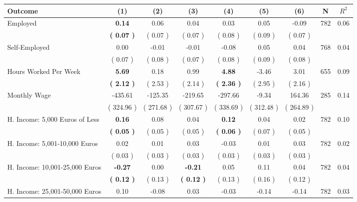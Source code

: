 \begin{tabular}{lcccccccc}
\toprule
 \textbf{Outcome} & \textbf{(1)} & \textbf{(2)} & \textbf{(3)} & \textbf{(4)} & \textbf{(5)} & \textbf{(6)} & \textbf{N} & \textbf{$ R^2$} \\
\midrule
Employed & \textbf{     0.14} &      0.06 &      0.04 &      0.03 &      0.05 &     -0.09 & 782 &       0.06 \\ 
 & \textbf{(     0.07 )} & (     0.07 ) & (     0.07 ) & (     0.08 ) & (     0.09 ) & (     0.07 ) & \\
Self-Employed &      0.00 &     -0.01 &     -0.01 &     -0.08 &      0.05 &      0.04 & 768 &       0.04 \\ 
 & (     0.07 ) & (     0.08 ) & (     0.07 ) & (     0.08 ) & (     0.09 ) & (     0.08 ) & \\
Hours Worked Per Week & \textbf{     5.69} &      0.18 &      0.99 & \textbf{     4.88} &     -3.46 &      3.01 & 655 &       0.09 \\ 
 & \textbf{(     2.12 )} & (     2.53 ) & (     2.14 ) & \textbf{(     2.36 )} & (     2.95 ) & (     2.16 ) & \\
Monthly Wage &   -435.61 &   -125.35 &   -219.65 &   -297.66 &     -9.34 &    164.36 & 285 &       0.14 \\ 
 & (   324.96 ) & (   271.68 ) & (   307.67 ) & (   338.69 ) & (   312.48 ) & (   264.89 ) & \\
H. Income: 5,000 Euros of Less & \textbf{     0.16} &      0.08 &      0.04 & \textbf{     0.12} &      0.04 &      0.02 & 782 &       0.10 \\ 
 & \textbf{(     0.05 )} & (     0.05 ) & (     0.05 ) & \textbf{(     0.06 )} & (     0.07 ) & (     0.05 ) & \\
H. Income: 5,001-10,000 Euros &      0.02 &      0.01 &      0.03 &     -0.03 &      0.01 &      0.03 & 782 &       0.02 \\ 
 & (     0.03 ) & (     0.03 ) & (     0.03 ) & (     0.03 ) & (     0.03 ) & (     0.03 ) & \\
H. Income: 10,001-25,000 Euros & \textbf{    -0.27} &      0.00 & \textbf{    -0.21} &      0.05 &      0.11 &      0.04 & 782 &       0.04 \\ 
 & \textbf{(     0.12 )} & (     0.13 ) & \textbf{(     0.12 )} & (     0.13 ) & (     0.16 ) & (     0.12 ) & \\
H. Income: 25,001-50,000 Euros &      0.10 &     -0.08 &      0.03 &     -0.03 &     -0.14 &     -0.14 & 782 &       0.03 \\ 

\end{tabular}
